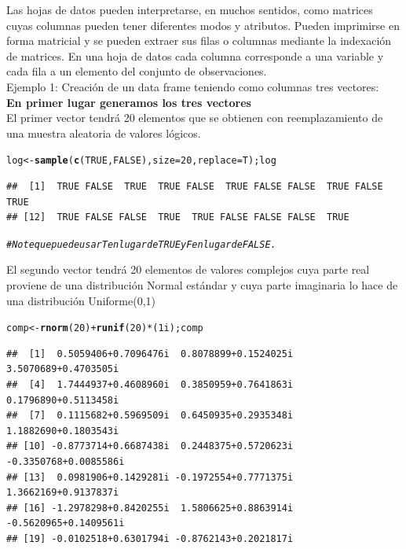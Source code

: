 \documentclass[12pt,letterpaper]{article}\usepackage[]{graphicx}\usepackage[]{color}
\makeatletter
\newcommand{\hlnum}[1]{\textcolor[rgb]{0.686,0.059,0.569}{#1}}%
\newcommand{\hlcom}[1]{\textcolor[rgb]{0.678,0.584,0.686}{\textit{#1}}}%
\newcommand{\hlopt}[1]{\textcolor[rgb]{0,0,0}{#1}}%
\newcommand{\hlstd}[1]{\textcolor[rgb]{0.345,0.345,0.345}{#1}}%
\newcommand{\hlkwb}[1]{\textcolor[rgb]{0.69,0.353,0.396}{#1}}%
\newcommand{\hlkwc}[1]{\textcolor[rgb]{0.333,0.667,0.333}{#1}}%
\newcommand{\hlkwd}[1]{\textcolor[rgb]{0.737,0.353,0.396}{\textbf{#1}}}%
\newenvironment{kframe}{%
 \def\at@end@of@kframe{}%
 \ifinner\ifhmode%
  \def\at@end@of@kframe{\end{minipage}}%
  \begin{minipage}{\columnwidth}%
 \fi\fi%
 \def\FrameCommand##1{\hskip\@totalleftmargin \hskip-\fboxsep
 \colorbox{shadecolor}{##1}\hskip-\fboxsep
     \hskip-\linewidth \hskip-\@totalleftmargin \hskip\columnwidth}%
 \MakeFramed {\advance\hsize-\width
   \@totalleftmargin\z@ \linewidth\hsize
   \@setminipage}}%
 {\par\unskip\endMakeFramed%
 \at@end@of@kframe}
\newenvironment{knitrout}{}{} %
\makeatother
\begin{document}
Las hojas de datos pueden interpretarse, en muchos sentidos, como matrices cuyas columnas pueden tener diferentes modos y atributos. Pueden imprimirse en forma matricial y se pueden extraer sus filas o columnas mediante la indexaci\'on de matrices. En una hoja de datos cada columna corresponde a una variable y cada fila a un elemento del conjunto de observaciones.\\

Ejemplo 1: Creaci\'on de un data frame teniendo como columnas tres vectores:\\

\textbf{En primer lugar generamos los tres vectores}\\

El primer vector tendr\'a 20 elementos que se obtienen con reemplazamiento de una muestra aleatoria de valores l\'ogicos.
\begin{knitrout}
\color{fgcolor}\begin{kframe}
\begin{alltt}
\hlstd{log} \hlkwb{<-} \hlkwd{sample}\hlstd{(}\hlkwd{c}\hlstd{(}\hlnum{TRUE}\hlstd{,} \hlnum{FALSE}\hlstd{),} \hlkwc{size} \hlstd{=} \hlnum{20}\hlstd{,} \hlkwc{replace} \hlstd{= T); log}
\end{alltt}
\begin{verbatim}
##  [1]  TRUE FALSE  TRUE  TRUE FALSE  TRUE FALSE FALSE  TRUE FALSE  TRUE
## [12]  TRUE FALSE FALSE  TRUE  TRUE FALSE FALSE FALSE  TRUE
\end{verbatim}
\begin{alltt}
\hlcom{# Note que puede usar T en lugar de TRUE y F en lugar de FALSE. }
\end{alltt}
\end{kframe}
\end{knitrout}

El segundo vector tendr\'a 20 elementos de valores complejos cuya parte real proviene de una distribuci\'on Normal est\'andar y cuya parte imaginaria lo hace de una distribuci\'on Uniforme(0,1)
\begin{knitrout}
\color{fgcolor}\begin{kframe}
\begin{alltt}
\hlstd{comp} \hlkwb{<-} \hlkwd{rnorm}\hlstd{(}\hlnum{20}\hlstd{)} \hlopt{+} \hlkwd{runif}\hlstd{(}\hlnum{20}\hlstd{)} \hlopt{*} \hlstd{(}\hlnum{1i}\hlstd{); comp}
\end{alltt}
\begin{verbatim}
##  [1]  0.5059406+0.7096476i  0.8078899+0.1524025i  3.5070689+0.4703505i
##  [4]  1.7444937+0.4608960i  0.3850959+0.7641863i  0.1796890+0.5113458i
##  [7]  0.1115682+0.5969509i  0.6450935+0.2935348i  1.1882690+0.1803543i
## [10] -0.8773714+0.6687438i  0.2448375+0.5720623i -0.3350768+0.0085586i
## [13]  0.0981906+0.1429281i -0.1972554+0.7771375i  1.3662169+0.9137837i
## [16] -1.2978298+0.8420255i  1.5806625+0.8863914i -0.5620965+0.1409561i
## [19] -0.0102518+0.6301794i -0.8762143+0.2021817i
\end{verbatim}
\end{kframe}
\end{knitrout}
\end{document}
